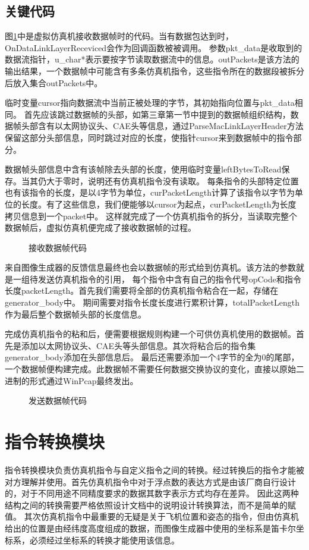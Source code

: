 \subsection{关键代码}
图\ref{codeSimRec}中是虚拟仿真机接收数据帧时的代码。当有数据包达到时，OnDataLinkLayerReceviced会作为回调函数被被调用。
参数pkt\_data是收取到的数据流指针，u\_char*表示要按字节读取数据流中的信息。outPackets是该方法的输出结果，一个数据帧中可能含有多条仿真机指令，这些指令所在的数据段被拆分后放入集合outPackets中。
\par
临时变量cursor指向数据流中当前正被处理的字节，其初始指向位置与pkt\_data相同。
首先应该跳过数据帧的头部，如第三章第一节中提到的数据帧组织结构，数据帧头部含有以太网协议头、CAE头等信息，通过ParseMacLinkLayerHeader方法保留这部分头部信息，同时跳过对应的长度，使指针cursor来到数据帧中的指令部分。
\par
数据帧头部信息中含有该帧除去头部的长度，使用临时变量leftBytesToRead保存。当其仍大于零时，说明还有仿真机指令没有读取。
每条指令的头部特定位置也有该指令的长度，是以4字节为单位，curPacketLength计算了该指令以字节为单位的长度。有了这些信息，我们便能够以cursor为起点，curPacketLength为长度拷贝信息到一个packet中。
这样就完成了一个仿真机指令的拆分，当读取完整个数据帧后，虚拟仿真机便完成了接收数据帧的过程。
\begin{figure}[h!]
    \centering
     
    \caption{接收数据帧代码}
    \label{codeSimRec}
\end{figure}
\par
来自图像生成器的反馈信息最终也会以数据帧的形式给到仿真机。该方法的参数就是一组待发送仿真机指令的引用，
每个指令中含有自己的指令代号opCode和指令长度packetLength。首先我们需要将全部的仿真机指令粘合在一起，存储在generator\_body中。
期间需要对指令长度长度进行累积计算，totalPacketLength作为最后整个数据帧头部的长度信息。
\clearpage
\par
完成仿真机指令的粘和后，便需要根据规则构建一个可供仿真机使用的数据帧。首先是添加以太网协议头、CAE头等头部信息。其次将粘合后的指令集generator\_body添加在头部信息后。
最后还需要添加一个4字节的全为0的尾部，一个数据帧便构建完成。此数据帧不需要任何数据交换协议的变化，直接以原始二进制的形式通过WinPcap最终发出。
\begin{figure}[h!]
    \centering
     
    \caption{发送数据帧代码}
    \label{codeSimSend}
\end{figure}

\section{指令转换模块}
指令转换模块负责仿真机指令与自定义指令之间的转换。经过转换后的指令才能被对方理解并使用。首先仿真机指令中对于浮点数的表达方式是由该厂商自行设计的，对于不同用途不同精度要求的数据其数字表示方式均存在差异。
因此这两种结构之间的转换需要严格依照设计文档中的说明设计转换算法，而不是简单的赋值。
其次仿真机指令中最重要的无疑是关于飞机位置和姿态的指令，但由仿真机给出的位置是由经纬度高度组成的数据，而图像生成器中使用的坐标系是笛卡尔坐标系，必须经过坐标系的转换才能使用该信息。
